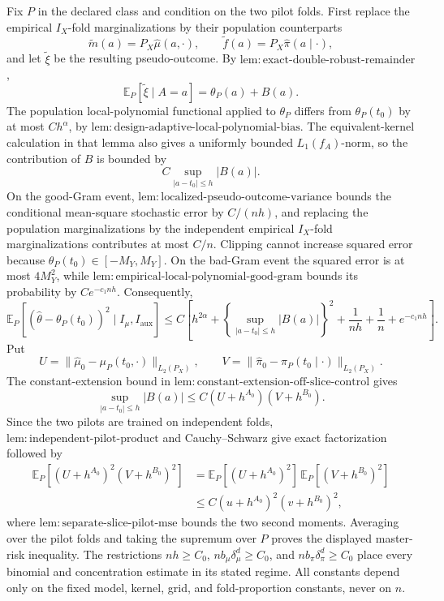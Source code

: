 Fix \(P\) in the declared class and condition on the two pilot folds. First replace the empirical \(I_X\)-fold marginalizations by their population counterparts
\[
\widetilde m(a)=P_X\widehat\mu(a,\cdot),
\qquad
\widetilde f(a)=P_X\widehat\pi(a\mid\cdot),
\]
and let \(\widetilde\xi\) be the resulting pseudo-outcome. By \(\mathrm{lem:exact\text{-}double\text{-}robust\text{-}remainder}\),
\[
\mathbb E_P[\widetilde\xi\mid A=a]=\theta_P(a)+B(a).
\]
The population local-polynomial functional applied to \(\theta_P\) differs from \(\theta_P(t_0)\) by at most \(Ch^\alpha\), by \(\mathrm{lem:design\text{-}adaptive\text{-}local\text{-}polynomial\text{-}bias}\). The equivalent-kernel calculation in that lemma also gives a uniformly bounded \(L_1(f_A)\)-norm, so the contribution of \(B\) is bounded by
\[
C\sup_{|a-t_0|\le h}|B(a)|.
\]
On the good-Gram event, \(\mathrm{lem:localized\text{-}pseudo\text{-}outcome\text{-}variance}\) bounds the conditional mean-square stochastic error by \(C/(nh)\), and replacing the population marginalizations by the independent empirical \(I_X\)-fold marginalizations contributes at most \(C/n\). Clipping cannot increase squared error because \(\theta_P(t_0)\in[-M_Y,M_Y]\). On the bad-Gram event the squared error is at most \(4M_Y^2\), while \(\mathrm{lem:empirical\text{-}local\text{-}polynomial\text{-}good\text{-}gram}\) bounds its probability by \(Ce^{-c_1nh}\). Consequently,
\[
\mathbb E_P[(\widehat\theta-\theta_P(t_0))^2\mid I_\mu,I_{\mathrm{aux}}]
\le C\left[
h^{2\alpha}+
\left\{\sup_{|a-t_0|\le h}|B(a)|\right\}^2+
\frac1{nh}+\frac1n+e^{-c_1nh}
\right].
\]
Put
\[
U=\|\widehat\mu_0-\mu_P(t_0,\cdot)\|_{L_2(P_X)},
\qquad
V=\|\widehat\pi_0-\pi_P(t_0\mid\cdot)\|_{L_2(P_X)}.
\]
The constant-extension bound in \(\mathrm{lem:constant\text{-}extension\text{-}off\text{-}slice\text{-}control}\) gives
\[
\sup_{|a-t_0|\le h}|B(a)|
\le C(U+h^{A_0})(V+h^{B_0}).
\]
Since the two pilots are trained on independent folds, \(\mathrm{lem:independent\text{-}pilot\text{-}product}\) and Cauchy--Schwarz give exact factorization followed by
\[
\begin{aligned}
\mathbb E_P[(U+h^{A_0})^2(V+h^{B_0})^2]
&=
\mathbb E_P[(U+h^{A_0})^2]\,
\mathbb E_P[(V+h^{B_0})^2]\\
&\le C(u+h^{A_0})^2(v+h^{B_0})^2,
\end{aligned}
\]
where \(\mathrm{lem:separate\text{-}slice\text{-}pilot\text{-}mse}\) bounds the two second moments. Averaging over the pilot folds and taking the supremum over \(P\) proves the displayed master-risk inequality. The restrictions \(nh\ge C_0\), \(nb_\mu\delta_\mu^d\ge C_0\), and \(nb_\pi\delta_\pi^d\ge C_0\) place every binomial and concentration estimate in its stated regime. All constants depend only on the fixed model, kernel, grid, and fold-proportion constants, never on \(n\).